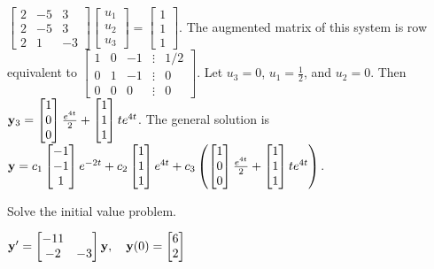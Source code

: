 \documentclass{ximera}
\begin{document}
\begin{problem}
\begin{solution}
$ \begin{bmatrix}2&-5&3\\2&-5&3\\2&1&-3\end{bmatrix}\begin{bmatrix}u_1\\u_2\\u_3\end{bmatrix}=
 \begin{bmatrix}1\\1\\1\end{bmatrix}$.
The augmented matrix of this system is row equivalent to
$ \begin{bmatrix}1&0&-1&\vdots&1/2\\0&1&-1&
\vdots&0\\0&0&0&\vdots&0\end{bmatrix}$.
Let $u_3=0$, $u_1=\frac{1 }{2}$, and $u_2=0$. Then ${\bf
y}_3= \begin{bmatrix}1\\0\\0\end{bmatrix}\frac{e^{4t} }{2}+ \begin{bmatrix}1\\1\\1\end{bmatrix}te^{4t}$. The
general solution is
 ${\bf y}= 
c_1\begin{bmatrix}-1\\-1\\1\end{bmatrix}e^{-2t}+c_2\begin{bmatrix}1\\1\\1\end{bmatrix}e^{4t}+c_3\left
(\begin{bmatrix}1\\0\\0\end{bmatrix}\frac{e^{4t} }{2}+\begin{bmatrix}1\\1\\1\end{bmatrix}te^{4t}\right)$.

 \end{solution}
 \end{problem}


 \begin{problem}\label{exer:10.5.13}
 Solve the initial value problem.
 
 $ {\bf
y}'= \begin{bmatrix}-11&\\-2&-3\end{bmatrix}{\bf y} ,\quad{\bf y}(0)= \begin{bmatrix}6\\2\end{bmatrix}$
 \end{problem}
\end{document}
